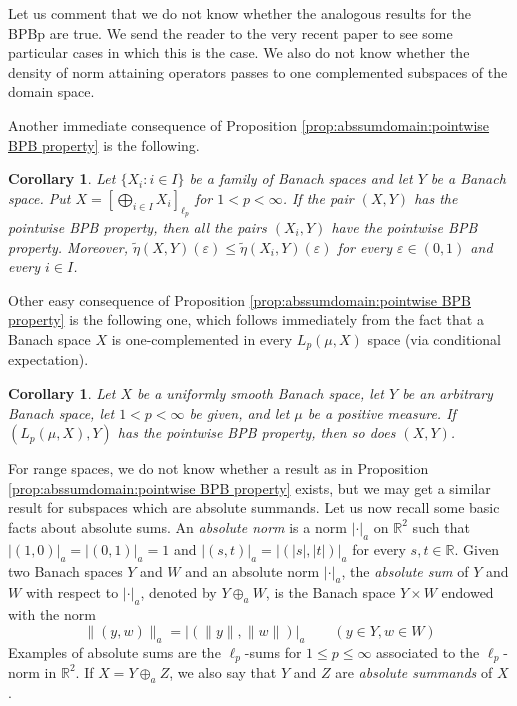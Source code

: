 \documentclass[a4paper,10pt]{amsart}
\theoremstyle{plain}
\newtheorem{corollary}[theorem]{Corollary}
\theoremstyle{definition}
\newcommand{\R}{\mathbb{R}}
\newcommand{\eps}{\varepsilon}
\renewcommand{\leq}{\leqslant}
\begin{document}
Let us comment that we do not know whether the analogous results for the BPBp are true. We send the reader to the very recent paper \cite{CDJM} to see some particular cases in which this is the case. We also do not know whether the density of norm attaining operators passes to one complemented subspaces of the domain space.

Another immediate consequence of Proposition \ref{prop:abssumdomain:pointwise BPB property} is the following.

\begin{corollary} Let $\{X_i\colon i \in I \}$ be a family of Banach spaces and let $Y$ be a Banach space. Put $X = \left[ \bigoplus_{i \in I} X_i \right]_{\ell_p}$ for $1 < p < \infty$. If the pair $(X, Y)$ has the pointwise BPB property, then all the pairs $(X_i, Y)$ have the pointwise BPB property. Moreover, $\tilde\eta(X,Y)(\eps)\leq \tilde\eta(X_i,Y)(\eps)$ for every $\eps\in (0,1)$ and every $i\in I$.
\end{corollary}	

Other easy consequence of Proposition \ref{prop:abssumdomain:pointwise BPB property} is the following one, which follows immediately from the fact that a Banach space $X$ is one-complemented in every $L_p(\mu,X)$ space (via conditional expectation).

\begin{corollary}
Let $X$ be a uniformly smooth Banach space, let $Y$ be an arbitrary Banach space, let $1 < p < \infty$ be given, and let $\mu$ be a positive measure. If $(L_p(\mu,X),Y)$ has the pointwise BPB property, then so does $(X,Y)$.
\end{corollary}




For range spaces, we do not know whether a result as in Proposition \ref{prop:abssumdomain:pointwise BPB property} exists, but we may get a similar result for subspaces which are absolute summands. Let us now recall some basic facts about absolute sums. An \emph{absolute norm} is a norm $| \cdot  |_a$ on $\R^2$ such that $|(1, 0)|_a = |(0, 1)|_a = 1$ and $|(s, t)|_a = |(|s|, |t|)|_a$ for every $s, t \in \R$. Given two Banach spaces $Y$ and $W$ and an absolute norm $|  \cdot |_a$, the \emph{absolute sum} of $Y$ and $W$ with respect to $|  \cdot  |_a$, denoted by $Y \oplus_a W$, is the Banach space $Y \times W$ endowed with the norm
\begin{equation*}
\|(y, w)\|_a = |(\|y\|, \|w\|)|_a \qquad (y \in Y, w \in W)
\end{equation*}
Examples of absolute sums are the $\ell_p$-sums for $1 \leq p \leq \infty$ associated to the $\ell_p$-norm in $\R^2$. If $X=Y\oplus_a Z$, we also say that $Y$ and $Z$ are \emph{absolute summands} of $X$.
\end{document}
